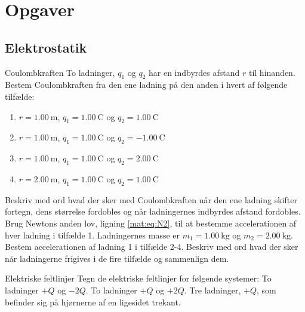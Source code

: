 \section{Opgaver}
\subsection*{Elektrostatik}
\begin{opgave}{Coulombkraften}
    To ladninger, $q_1$ og $q_2$ har en indbyrdes afstand $r$ til hinanden.
    \opg Bestem Coulombkraften fra den ene ladning på den anden i hvert af følgende tilfælde:
    \begin{enumerate}
        \item $r = \SI{1,00}{\metre}$, $q_1 = \SI{1,00}{\coulomb}$ og $q_2 = \SI{1,00}{\coulomb}$
        \item $r = \SI{1,00}{\metre}$, $q_1 = \SI{1,00}{\coulomb}$ og $q_2 = \SI{-1,00}{\coulomb}$
        \item $r = \SI{1,00}{\metre}$, $q_1 = \SI{1,00}{\coulomb}$ og $q_2 = \SI{2,00}{\coulomb}$
        \item $r = \SI{2,00}{\metre}$, $q_1 = \SI{1,00}{\coulomb}$ og $q_2 = \SI{1,00}{\coulomb}$
    \end{enumerate}
    \opg Beskriv med ord hvad der sker med Coulombkraften når den ene ladning skifter fortegn, dens størrelse fordobles og når ladningernes indbyrdes afstand fordobles.
    \opg Brug Newtons anden lov, ligning \eqref{mat:eq:N2}, til at bestemme accelerationen af hver ladning i tilfælde 1. Ladningernes masse er $m_1 = \SI{1,00}{\kilo\gram}$ og $m_2 = \SI{2,00}{\kilo\gram}$.
    \opg Bestem accelerationen af ladning 1 i tilfælde 2-4.
    \opg Beskriv med ord hvad der sker når ladningerne frigives i de fire tilfælde og sammenlign dem.
\end{opgave}

\begin{opgave}{Elektriske feltlinjer}
    Tegn de elektriske feltlinjer for følgende systemer:
    \opg To ladninger $+Q$ og $-2Q$.
    \opg To ladninger $+Q$ og $+2Q$.
    \opg Tre ladninger, $+Q$, som befinder sig på hjørnerne af en ligesidet trekant.
\end{opgave}


